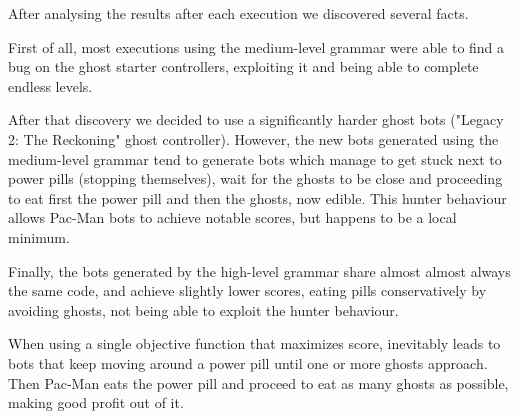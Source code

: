 \documentclass{llncs}
\newcommand{\pacman}{Ms. Pac-Man vs. Ghosts }
\newcommand{\paco}{Pac-Man }
\begin{document}
After analysing the results after each execution we discovered several facts. 

First of all, most executions using the medium-level grammar were able to find a bug on the ghost starter controllers, exploiting it and being able to complete endless levels.

After that discovery we decided to use a significantly harder ghost bots ("Legacy 2: The Reckoning" ghost controller). However, the new bots generated using the medium-level grammar tend to generate bots which manage to get stuck next to power pills (stopping themselves), wait for the ghosts to be close and proceeding to eat first the power pill and then the ghosts, now edible. This hunter behaviour allows \paco bots to achieve notable scores, but happens to be a local minimum.

Finally, the bots generated by the high-level grammar share almost almost always the same code, and achieve slightly lower scores, eating pills conservatively by avoiding ghosts, not being able to exploit the hunter behaviour.

When using a single objective function that maximizes score, inevitably leads to bots that keep moving around a power pill until one or more ghosts approach. Then \paco eats the power pill and proceed to eat as many ghosts as possible, making good profit out of it.
\end{document}

